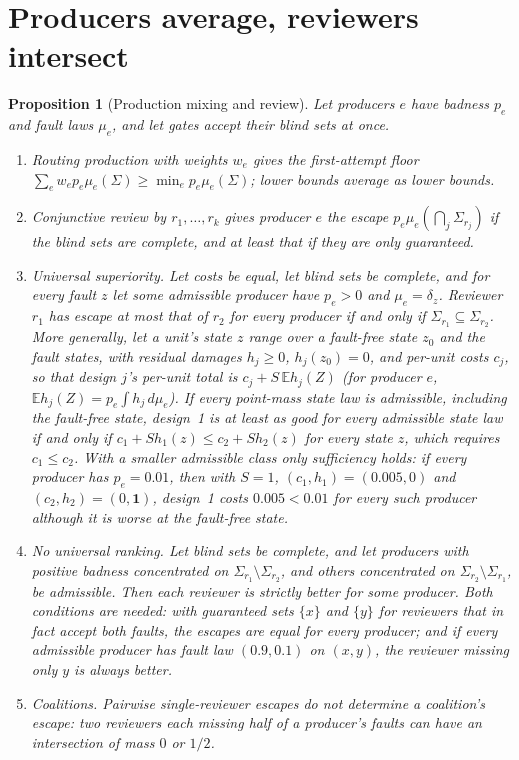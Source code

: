 \documentclass[11pt]{article}
\newtheorem{proposition}[theorem]{Proposition}
\theoremstyle{definition}
\theoremstyle{remark}
\newcommand{\E}{\mathbb E}
\newcommand{\ind}{\mathbf 1}
\begin{document}
\section{Producers average, reviewers intersect}\label{sec:review}
\begin{proposition}[Production mixing and review]\label{prop:review}
Let producers $e$ have badness $p_e$ and fault laws $\mu_e$, and let gates accept their blind sets at
once.
\begin{enumerate}[label=(\alph*),itemsep=2pt]
\item \begin{sloppypar}Routing production with weights $w_e$ gives the first-attempt floor
$\sum_ew_ep_e\mu_e(\Sigma)\ge\min_ep_e\mu_e(\Sigma)$; lower bounds average as lower bounds.\end{sloppypar}
\item Conjunctive review by $r_1,\dots,r_k$ gives producer $e$ the escape
$p_e\mu_e(\bigcap_j\Sigma_{r_j})$ if the blind sets are complete, and at least that if they are only
guaranteed.
\item \emph{Universal superiority.} Let costs be equal, let blind sets be complete, and for every fault
$z$ let some admissible producer have $p_e>0$ and $\mu_e=\delta_z$. Reviewer $r_1$ has escape at most that of $r_2$ for every
producer if and only if $\Sigma_{r_1}\subseteq\Sigma_{r_2}$. More generally, let a unit's state $z$ range
over a fault-free state $z_0$ and the fault states, with residual damages $h_j\ge0$, $h_j(z_0)=0$, and
per-unit costs $c_j$, so that design $j$'s per-unit total is $c_j+S\,\E h_j(Z)$ (for producer $e$,
$\E h_j(Z)=p_e\int h_j\,d\mu_e$). If every point-mass state law is admissible, including the fault-free
state, design~1 is at least as good for every admissible state law if and only if
$c_1+Sh_1(z)\le c_2+Sh_2(z)$ for every state $z$, which requires $c_1\le c_2$. With a smaller admissible
class only sufficiency holds: if every producer has $p_e=0.01$, then with $S=1$, $(c_1,h_1)=(0.005,0)$
and $(c_2,h_2)=(0,\ind)$, design~1 costs $0.005<0.01$ for every such producer although it is worse at
the fault-free state.
\item \emph{No universal ranking.} Let blind sets be complete, and let producers with positive badness
concentrated on $\Sigma_{r_1}\setminus\Sigma_{r_2}$, and others concentrated on
$\Sigma_{r_2}\setminus\Sigma_{r_1}$, be admissible. Then each reviewer is strictly better for some producer.
Both conditions are needed: with guaranteed sets $\{x\}$ and $\{y\}$ for reviewers that in fact accept
both faults, the escapes are equal for every producer; and if every admissible producer has fault law
$(0.9,0.1)$ on $(x,y)$, the reviewer missing only $y$ is always better.
\item \emph{Coalitions.} Pairwise single-reviewer escapes do not determine a coalition's escape: two
reviewers each missing half of a producer's faults can have an intersection of mass $0$ or $1/2$.
\end{enumerate}
\end{proposition}
\end{document}
